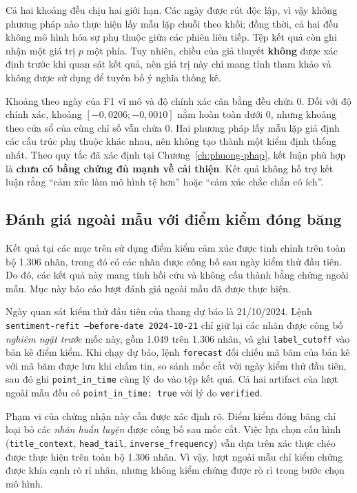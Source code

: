 \documentclass[12pt, a4paper, oneside]{report}
\begin{document}
Cả hai khoảng đều chịu hai giới hạn. Các ngày được rút độc lập, vì vậy không phương pháp nào thực hiện lấy mẫu
lặp chuỗi theo khối; đồng thời, cả hai đều không mô hình hóa sự phụ thuộc giữa các phiên liên tiếp.
Tệp kết quả còn ghi nhận một giá trị $p$ một phía. Tuy nhiên, chiều của giả thuyết \textbf{không}
được xác định trước khi quan sát kết quả, nên giá trị này chỉ mang tính tham khảo và không được sử dụng để
tuyên bố ý nghĩa thống kê.

Khoảng theo ngày của F1 vĩ mô và độ chính xác cân bằng đều chứa 0. Đối với độ chính xác,
khoảng $[-0{,}0206; -0{,}0010]$ nằm hoàn toàn dưới 0, nhưng khoảng theo cửa sổ của cùng chỉ
số vẫn chứa 0. Hai phương pháp lấy mẫu lặp giả định các cấu trúc phụ thuộc khác nhau, nên không
tạo thành một kiểm định thống nhất. Theo quy tắc đã xác định tại
Chương~\ref{ch:phuong-phap}, kết luận phù hợp là \textbf{chưa có bằng chứng đủ mạnh về
cải thiện}. Kết quả không hỗ trợ kết luận rằng ``cảm xúc làm mô hình tệ hơn'' hoặc ``cảm xúc chắc chắn có ích''.

\subsection{Đánh giá ngoài mẫu với điểm kiểm đóng băng}
\label{sec:kq-point-in-time}

Kết quả tại các mục trên sử dụng điểm kiểm cảm xúc được tinh chỉnh trên toàn bộ 1.306 nhãn,
trong đó có các nhãn được công bố sau ngày kiểm thử đầu tiên. Do đó, các kết quả này mang tính hồi cứu và
không cấu thành bằng chứng ngoài mẫu. Mục này báo cáo lượt đánh giá ngoài mẫu đã được thực hiện.

Ngày quan sát kiểm thử đầu tiên của thang dự báo là 21/10/2024. Lệnh
\texttt{sentiment-refit --before-date 2024-10-21} chỉ giữ lại các nhãn được công bố
\emph{nghiêm ngặt trước} mốc này, gồm 1.049 trên 1.306 nhãn, và ghi
\texttt{label\_cutoff} vào bản kê điểm kiểm. Khi chạy dự báo, lệnh \texttt{forecast}
đối chiếu mã băm của bản kê với mã băm được lưu khi chấm tin, so sánh mốc cắt với ngày
kiểm thử đầu tiên, sau đó ghi \texttt{point\_in\_time} cùng lý do vào tệp kết quả. Cả
hai artifact của lượt ngoài mẫu đều có \texttt{point\_in\_time: true} với lý do
\texttt{verified}.

Phạm vi của chứng nhận này cần được xác định rõ. Điểm kiểm đóng băng chỉ loại bỏ các
\emph{nhãn huấn luyện} được công bố sau mốc cắt. Việc lựa chọn cấu hình
(\texttt{title\_context}, \texttt{head\_tail}, \texttt{inverse\_frequency}) vẫn
dựa trên xác thực chéo được thực hiện trên toàn bộ 1.306 nhãn. Vì vậy, lượt ngoài mẫu chỉ
kiểm chứng được khía cạnh rò rỉ nhãn, nhưng không kiểm chứng được rò rỉ trong bước chọn mô hình.
\end{document}
